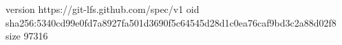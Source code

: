 version https://git-lfs.github.com/spec/v1
oid sha256:5340cd99e0fd7a8927fa501d3690f5c64545d28d1c0ea76caf9bd3c2a88d02f8
size 97316
